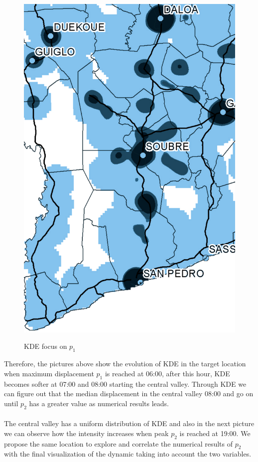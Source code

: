 \begin{figure}[h!]
{    \includegraphics[scale = 0.1]{results/images/kernel/l_hour8_kd_detail.pdf}
	\label{fig:subfig2_detail}
}
\caption[KDE focus on $p_1$]{KDE focus on $p_1$}
\label{fig:subfigureExample}
\end{figure}


Therefore, the pictures above show the evolution of KDE in the target location when maximum displacement $p_1$ is reached at 06:00, after this hour, KDE becomes softer at 07:00 and 08:00 starting the central valley. Through KDE  we can figure out that the median displacement in the central valley 08:00 and go on until $p_2$ has a greater value as numerical results leads.
\\
\\
The central valley has a uniform distribution of KDE and also in the next picture we can observe how the intensity increases when peak $p_2$ is reached at 19:00. We propose the same location to explore and correlate the numerical results of $p_2$ with the final visualization of the dynamic taking into account the two variables.



